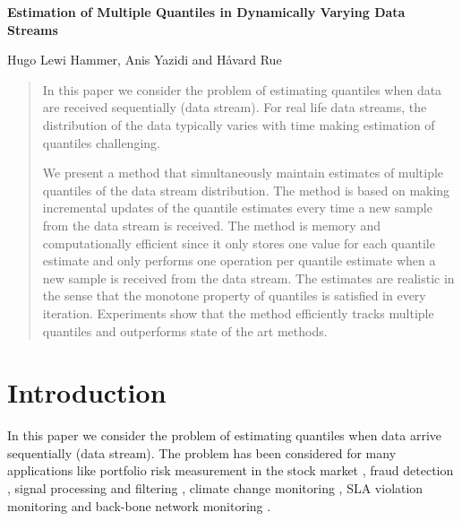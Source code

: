 \documentclass[10pt, a4paper]{article}
\newtheorem{rational for conjecture}{Rational for Conjecture}
\begin{document}
\LARGE

\noindent \textbf{Estimation of Multiple Quantiles in Dynamically Varying Data Streams}

\begin{center}
  Hugo Lewi Hammer, Anis Yazidi and H{\aa}vard Rue
\end{center}

\normalsize

\begin{abstract}
In this paper we consider the problem of estimating quantiles when data are received sequentially (data stream). For real life data streams, the distribution of the data typically varies with time making estimation of quantiles challenging.

We present a method that simultaneously maintain estimates of multiple quantiles of the data stream distribution. The method is based on making incremental updates of the quantile estimates every time a new sample from the data stream is received. The method is memory and computationally efficient since it only stores one value for each quantile estimate and only performs one operation per quantile estimate when a new sample is received from the data stream. The estimates are realistic in the sense that the monotone property of quantiles is satisfied in every iteration. Experiments show that the method efficiently tracks multiple quantiles and outperforms state of the art methods.
\end{abstract}

\section{Introduction}

In this paper we consider the problem of estimating quantiles when data arrive sequentially (data stream). The problem has been considered for many applications like portfolio risk measurement in the stock market \cite{gilli2006application, abbasi2013bootstrap}, fraud detection \cite{zhang2008detecting}, signal processing and filtering \cite{stahl2000quantile}, climate change monitoring \cite{zhang2011indices}, SLA violation monitoring \cite{sommers2007accurate,sommers2010multiobjective}
and  back-bone network  monitoring \cite{choi2007quantile}.
\end{document}
